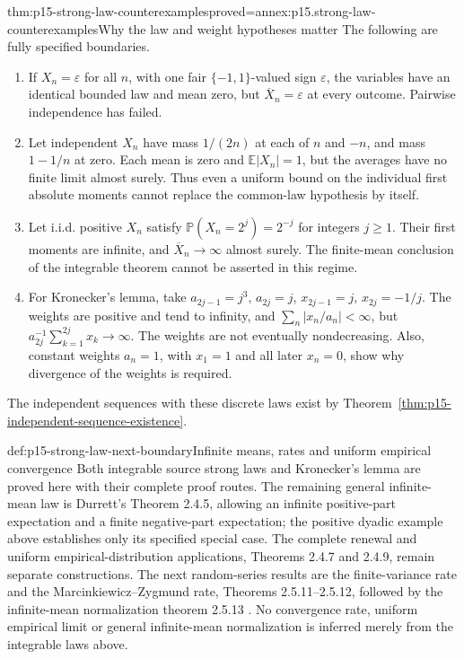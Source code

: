 \begin{hbtheorem}{thm:p15-strong-law-counterexamples}{proved=annex:p15.strong-law-counterexamples}{Why the law and weight hypotheses matter}
The following are fully specified boundaries.
\begin{enumerate}
\item If \(X_n=\varepsilon\) for all \(n\), with one fair
\(\{-1,1\}\)-valued sign \(\varepsilon\), the variables have an
identical bounded law and mean zero, but
\(\overline X_n=\varepsilon\) at every outcome. Pairwise independence
has failed.
\item Let independent \(X_n\) have mass \(1/(2n)\) at each of
\(n\) and \(-n\), and mass \(1-1/n\) at zero. Each mean is zero
and \(\mathbb E|X_n|=1\), but the averages have no finite limit
almost surely. Thus even a uniform bound on the individual first
absolute moments cannot replace the common-law hypothesis by itself.
\item Let i.i.d. positive \(X_n\) satisfy
\(\mathbb P(X_n=2^j)=2^{-j}\) for integers \(j\geq1\).
Their first moments are infinite, and
\(\overline X_n\to\infty\) almost surely. The finite-mean conclusion
of the integrable theorem cannot be asserted in this regime.
\item For Kronecker's lemma, take
\(a_{2j-1}=j^3\), \(a_{2j}=j\), \(x_{2j-1}=j\),
\(x_{2j}=-1/j\). The weights are positive and tend to infinity,
and \(\sum_n|x_n/a_n|<\infty\), but
\(a_{2j}^{-1}\sum_{k=1}^{2j}x_k\to\infty\).
The weights are not eventually nondecreasing.
Also, constant weights \(a_n=1\), with \(x_1=1\) and all later
\(x_n=0\), show why divergence of the weights is required.
\end{enumerate}
The independent sequences with these discrete laws exist by
Theorem~\ref{thm:p15-independent-sequence-existence}.
\end{hbtheorem}

\begin{proofboundary}{def:p15-strong-law-next-boundary}{Infinite means, rates and uniform empirical convergence}
Both integrable source strong laws and Kronecker's lemma are proved
here with their complete proof routes. The remaining general
infinite-mean law is Durrett's Theorem 2.4.5, allowing an infinite
positive-part expectation and a finite negative-part expectation;
the positive dyadic example above establishes only its specified
special case. The complete renewal and uniform empirical-distribution
applications, Theorems 2.4.7 and 2.4.9, remain separate constructions.
The next random-series results are the finite-variance rate and the
Marcinkiewicz--Zygmund rate, Theorems 2.5.11--2.5.12, followed by the
infinite-mean normalization theorem 2.5.13
\cite[pp.~78--80, 87--90]{DurrettPTEAuthor2019}. No convergence rate,
uniform empirical limit or general infinite-mean normalization is
inferred merely from the integrable laws above.
\end{proofboundary}

